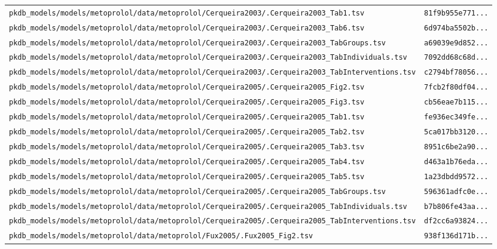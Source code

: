 \documentclass{article}
\begin{document}
\begin{longtable}{ll}
\texttt{pkdb\_models/models/metoprolol/data/metoprolol/Cerqueira2003/.Cerqueira2003\_Tab1.tsv} & \texttt{81f9b955e771...} \\
\texttt{pkdb\_models/models/metoprolol/data/metoprolol/Cerqueira2003/.Cerqueira2003\_Tab6.tsv} & \texttt{6d974ba5502b...} \\
\texttt{pkdb\_models/models/metoprolol/data/metoprolol/Cerqueira2003/.Cerqueira2003\_TabGroups.tsv} & \texttt{a69039e9d852...} \\
\texttt{pkdb\_models/models/metoprolol/data/metoprolol/Cerqueira2003/.Cerqueira2003\_TabIndividuals.tsv} & \texttt{7092dd68c68d...} \\
\texttt{pkdb\_models/models/metoprolol/data/metoprolol/Cerqueira2003/.Cerqueira2003\_TabInterventions.tsv} & \texttt{c2794bf78056...} \\
\texttt{pkdb\_models/models/metoprolol/data/metoprolol/Cerqueira2005/.Cerqueira2005\_Fig2.tsv} & \texttt{7fcb2f80df04...} \\
\texttt{pkdb\_models/models/metoprolol/data/metoprolol/Cerqueira2005/.Cerqueira2005\_Fig3.tsv} & \texttt{cb56eae7b115...} \\
\texttt{pkdb\_models/models/metoprolol/data/metoprolol/Cerqueira2005/.Cerqueira2005\_Tab1.tsv} & \texttt{fe936ec349fe...} \\
\texttt{pkdb\_models/models/metoprolol/data/metoprolol/Cerqueira2005/.Cerqueira2005\_Tab2.tsv} & \texttt{5ca017bb3120...} \\
\texttt{pkdb\_models/models/metoprolol/data/metoprolol/Cerqueira2005/.Cerqueira2005\_Tab3.tsv} & \texttt{8951c6be2a90...} \\
\texttt{pkdb\_models/models/metoprolol/data/metoprolol/Cerqueira2005/.Cerqueira2005\_Tab4.tsv} & \texttt{d463a1b76eda...} \\
\texttt{pkdb\_models/models/metoprolol/data/metoprolol/Cerqueira2005/.Cerqueira2005\_Tab5.tsv} & \texttt{1a23dbdd9572...} \\
\texttt{pkdb\_models/models/metoprolol/data/metoprolol/Cerqueira2005/.Cerqueira2005\_TabGroups.tsv} & \texttt{596361adfc0e...} \\
\texttt{pkdb\_models/models/metoprolol/data/metoprolol/Cerqueira2005/.Cerqueira2005\_TabIndividuals.tsv} & \texttt{b7b806fe43aa...} \\
\texttt{pkdb\_models/models/metoprolol/data/metoprolol/Cerqueira2005/.Cerqueira2005\_TabInterventions.tsv} & \texttt{df2cc6a93824...} \\
\texttt{pkdb\_models/models/metoprolol/data/metoprolol/Fux2005/.Fux2005\_Fig2.tsv} & \texttt{938f136d171b...} \\

\end{longtable}
\end{document}
